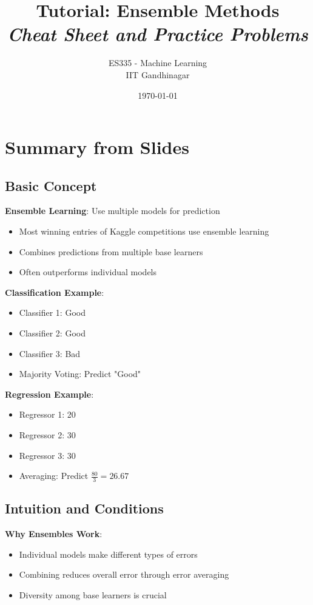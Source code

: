 \documentclass{article}
\title{\textbf{Tutorial: Ensemble Methods} \\ \textit{Cheat Sheet and Practice Problems}}
\author{ES335 - Machine Learning \\ IIT Gandhinagar}
\date{\today}
\begin{document}
\maketitle

\section{Summary from Slides}

\subsection{Basic Concept}

\textbf{Ensemble Learning}: Use multiple models for prediction
\begin{itemize}
    \item Most winning entries of Kaggle competitions use ensemble learning
    \item Combines predictions from multiple base learners
    \item Often outperforms individual models
\end{itemize}

\textbf{Classification Example}:
\begin{itemize}
    \item Classifier 1: Good
    \item Classifier 2: Good  
    \item Classifier 3: Bad
    \item Majority Voting: Predict "Good"
\end{itemize}

\textbf{Regression Example}:
\begin{itemize}
    \item Regressor 1: 20
    \item Regressor 2: 30
    \item Regressor 3: 30
    \item Averaging: Predict $\frac{80}{3} = 26.67$
\end{itemize}

\subsection{Intuition and Conditions}

\textbf{Why Ensembles Work}:
\begin{itemize}
    \item Individual models make different types of errors
    \item Combining reduces overall error through error averaging
    \item Diversity among base learners is crucial
\end{itemize}
\end{document}
